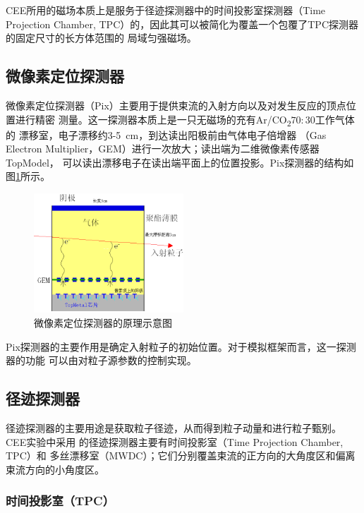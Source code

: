 \documentclass[bachelor,openany,oneside,color]{buaathesis}
\begin{document}
CEE所用的磁场本质上是服务于径迹探测器中的时间投影室探测器（Time Projection Chamber,
TPC）的，因此其可以被简化为覆盖一个包覆了TPC探测器的固定尺寸的长方体范围的
局域匀强磁场。

\subsection{微像素定位探测器}\label{ssec:det:track}

微像素定位探测器（Pix）主要用于提供束流的入射方向以及对发生反应的顶点位置进行精密
测量。这一探测器本质上是一只无磁场的充有Ar/CO\textsubscript{2}$70:30$工作气体的
漂移室，电子漂移约3-\SI{5}{\centi\meter}，到达读出阳极前由气体电子倍增器
（Gas Electron Multiplier，GEM）进行一次放大；读出端为二维微像素传感器TopModel，
可以读出漂移电子在读出端平面上的位置投影。Pix探测器的结构如图\ref{fig:det:Pix}所示。

\begin{figure}
	\centering
	\includegraphics[width=0.5\textwidth]{./resource/CEE-Pix.png}
	\caption{微像素定位探测器的原理示意图}
	\label{fig:det:Pix}
\end{figure}

Pix探测器的主要作用是确定入射粒子的初始位置。对于模拟框架而言，这一探测器的功能
可以由对粒子源参数的控制实现。

\subsection{径迹探测器}

径迹探测器的主要用途是获取粒子径迹，从而得到粒子动量和进行粒子甄别。CEE实验中采用
的径迹探测器主要有时间投影室（Time Projection Chamber, TPC）和
多丝漂移室（MWDC）；它们分别覆盖束流的正方向的大角度区和偏离束流方向的小角度区。

\subsubsection{时间投影室（TPC）}
\end{document}
